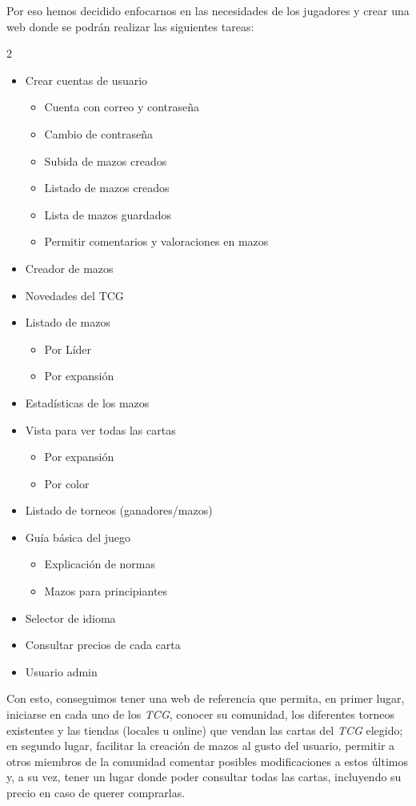 \documentclass[10pt]{article}
\begin{document}
	Por eso hemos decidido enfocarnos en las necesidades de los jugadores y crear una web donde se podrán realizar las siguientes tareas:
	\begin{multicols}{2} 
		\begin{itemize}
			\item Crear cuentas de usuario
			\begin{itemize} 
				\item Cuenta con correo y contraseña
				\item Cambio de contraseña
				\item Subida de mazos creados
				\item Listado de mazos creados
				\item Lista de mazos guardados
				\item Permitir comentarios y valoraciones en mazos
			\end{itemize}
			
			\item Creador de mazos
			\item Novedades del TCG
			\item Listado de mazos
			\begin{itemize}
				\item Por Líder
				\item Por expansión
			\end{itemize}
			
			\item Estadísticas de los mazos
			\item Vista para ver todas las cartas
			\begin{itemize}
				\item Por expansión
				\item Por color
			\end{itemize}
			
			\item Listado de torneos (ganadores/mazos)
			\item Guía básica del juego
			\begin{itemize}
				\item Explicación de normas
				\item Mazos para principiantes
			\end{itemize}
			
			\item Selector de idioma
			\item Consultar precios de cada carta
			\item Usuario admin
		\end{itemize}
	\end{multicols} 
	Con esto, conseguimos tener una web de referencia que permita, en primer lugar, iniciarse en cada uno de los \textit{TCG}, conocer su comunidad, los diferentes torneos existentes y las tiendas (locales u online) que vendan las cartas del \textit{TCG} elegido; en segundo lugar, facilitar la creación de mazos al gusto del usuario, permitir a otros miembros de la comunidad comentar posibles modificaciones a estos últimos y, a su vez, tener un lugar donde poder consultar todas las cartas, incluyendo su precio en caso de querer comprarlas.\\
    
\end{document}

